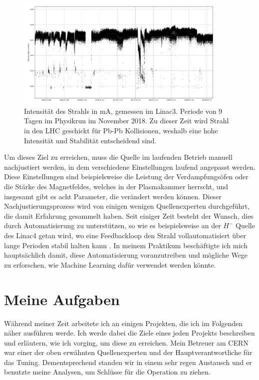 \documentclass[11pt, a4paper, titlepage, headings=standardclasses]{scrartcl}
\begin{document}
\begin{figure}
    \centering
    \includegraphics[width=0.9\textwidth]{current_demo.png}
    \caption{Intensität des Strahls in mA, gemessen im Linac3. Periode von 9 Tagen im Physikrun im November 2018. Zu dieser Zeit wird Strahl in den LHC geschickt für Pb-Pb Kollisionen, weshalb eine hohe Intensität und Stabilität entscheidend sind.}
    \label{fig:current_demo}
\end{figure}

Um dieses Ziel zu erreichen, muss die Quelle im laufenden Betrieb manuell nachjustiert werden, in dem verschiedene Einstellungen laufend angepasst werden. Diese Einstellungen sind beispielsweise die Leistung der Verdampfungsöfen oder die Stärke des Magnetfeldes, welches in der Plasmakammer herrscht, und insgesamt gibt es acht Parameter, die verändert werden können. Dieser Nachjustierungsprozess wird von einigen wenigen Quellenexperten durchgeführt, die damit Erfahrung gesammelt haben. Seit einiger Zeit besteht der Wunsch, dies durch Automatisierung zu unterstützen, so wie es beispielsweise an der $H^-$ Quelle des Linac4 getan wird, wo eine Feedbackloop den Strahl vollautomatisiert über lange Perioden stabil halten kann \cite{Voulgarakis:Autopilot}. In meinem Praktikum beschäftigte ich mich hauptsächlich damit, diese Automatisierung voranzutreiben und mögliche Wege zu erforschen, wie Machine Learning dafür verwendet werden könnte.

\section{Meine Aufgaben}

Während meiner Zeit arbeitete ich an einigen Projekten, die ich im Folgenden näher ausführen werde. Ich werde dabei die Ziele eines jeden Projekts beschreiben und erläutern, wie ich vorging, um diese zu erreichen. Mein Betreuer am CERN war einer der oben erwähnten Quellenexperten und der Hauptverantwortliche für das Tuning. Dementsprechend standen wir in einem sehr regen Austausch und er benutzte meine Analysen, um Schlüsse für die Operation zu ziehen.
\end{document}
